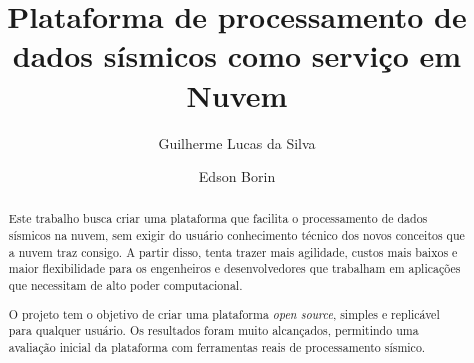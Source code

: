 \documentclass[11pt,twoside]{article}
\begin{document}
% 

%



\TRMakeCover


%
\pagestyle{myheadings}

%
\title{Plataforma de processamento de dados sísmicos como serviço em Nuvem}

\author{Guilherme Lucas da Silva \and Edson Borin}

\date{}

\maketitle


\begin{abstract} 
  Este trabalho busca criar uma plataforma que facilita o 
  processamento de dados sísmicos na nuvem, sem exigir do usuário conhecimento técnico dos
  novos conceitos que a nuvem traz consigo. A partir disso, tenta trazer
  mais agilidade, custos mais baixos e maior flexibilidade para os 
  engenheiros e desenvolvedores que trabalham em aplicações que 
  necessitam de alto poder computacional.

  O projeto tem o objetivo de criar uma plataforma
  \emph{open source}, simples e replicável para qualquer 
  usuário. Os resultados foram muito alcançados, permitindo uma avaliação inicial da plataforma
  com ferramentas reais de processamento sísmico.
\end{abstract}
\end{document}
